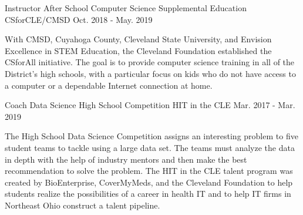 
\begin{cventries}

  \cventry
    {Instructor} %
    {After School Computer Science Supplemental Education} %
    {CSforCLE/CMSD} %
    {Oct. 2018 - May. 2019} %
    {
      \begin{cvcompactparagraph}
        With CMSD, Cuyahoga County, Cleveland State University, and Envision Excellence in STEM Education, the Cleveland Foundation established the CSforAll initiative. The goal is to provide computer science training in all of the District's high schools, with a particular focus on kids who do not have access to a computer or a dependable Internet connection at home.
      \end{cvcompactparagraph}
    }

  \cventry
    {Coach} %
    {Data Science High School Competition} %
    {HIT in the CLE} %
    {Mar. 2017 - Mar. 2019} %
    {
      \begin{cvcompactparagraph}
        The High School Data Science Competition assigns an interesting problem to five student teams to tackle using a large data set. The teams must analyze the data in depth with the help of industry mentors and then make the best recommendation to solve the problem. The HIT in the CLE talent program was created by BioEnterprise, CoverMyMeds, and the Cleveland Foundation to help students realize the possibilities of a career in health IT and to help IT firms in Northeast Ohio construct a talent pipeline.
      \end{cvcompactparagraph}
    }


\end{cventries}
